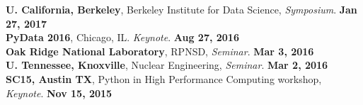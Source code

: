 \documentclass[margin,line]{resume}
\begin{document}
\begin{resume}
      \textbf{U. California, Berkeley}, Berkeley Institute for Data Science, \emph{Symposium}.  \hfill\textbf{Jan 27, 2017}\\
      \textbf{PyData 2016}, Chicago, IL. \emph{Keynote}.  \hfill\textbf{Aug 27, 2016}\\
      \textbf{Oak Ridge National Laboratory}, RPNSD, \emph{Seminar}.  \hfill\textbf{Mar 3, 2016}\\
      \textbf{U. Tennessee, Knoxville}, Nuclear Engineering, \emph{Seminar}.  \hfill\textbf{Mar 2, 2016}\\
      \textbf{SC15, Austin TX}, Python in High Performance Computing workshop, 
      \emph{Keynote}.     \hfill\textbf{Nov 15, 2015}\vspace{-4.5mm}\\

\end{resume}
\end{document}
